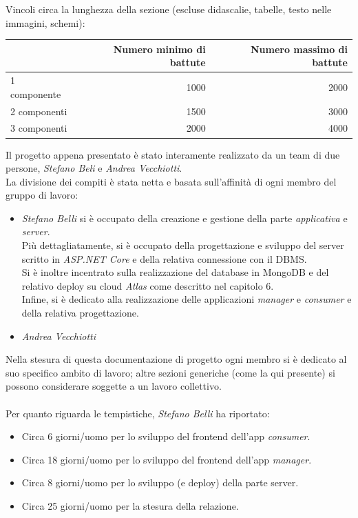 \documentclass[12pt]{article}
\begin{document}
Vincoli circa la lunghezza della sezione (escluse didascalie, tabelle, testo nelle immagini, schemi):

\vspace{1cm}
\begin{tabular}{l|rr}
 & Numero minimo di battute & Numero massimo di battute \\
 \hline
 1 componente & 1000 & 2000 \\
 2 componenti & 1500 & 3000 \\
 3 componenti & 2000 & 4000 \\
 \hline
\end{tabular}

\newpage

Il progetto appena presentato è stato interamente realizzato da un team di due persone, \textit{Stefano Beli} e \textit{Andrea Vecchiotti}.\\
La divisione dei compiti è stata netta e basata sull'affinità di ogni membro del gruppo di lavoro:
\begin{itemize}
	\item \textit{Stefano Belli} si è occupato della creazione e gestione della parte \textit{applicativa} e \textit{server}.\\
	Più dettagliatamente, si è occupato della progettazione e sviluppo del server scritto in \textit{ASP.NET Core} e della relativa connessione con il DBMS.\\
	Si è inoltre incentrato sulla realizzazione del database in MongoDB e del relativo deploy su cloud \textit{Atlas} come descritto nel capitolo 6.\\
	Infine, si è dedicato alla realizzazione delle applicazioni \textit{manager} e \textit{consumer} e della relativa progettazione.
	\item \textit{Andrea Vecchiotti}
\end{itemize}
Nella stesura di questa documentazione di progetto ogni membro si è dedicato al suo specifico ambito di lavoro; altre sezioni generiche (come la qui presente) si possono considerare soggette a un lavoro collettivo.\\\\
Per quanto riguarda le tempistiche, \textit{Stefano Belli}  ha riportato:
\begin{itemize}
\item Circa 6 giorni/uomo per lo sviluppo del frontend dell'app \textit{consumer}.
\item Circa 18 giorni/uomo per lo sviluppo del frontend dell'app \textit{manager}.
\item Circa 8 giorni/uomo per lo sviluppo (e deploy) della parte server.
\item Circa 25 giorni/uomo per la stesura della relazione.
\end{itemize}
\newpage
\end{document}
